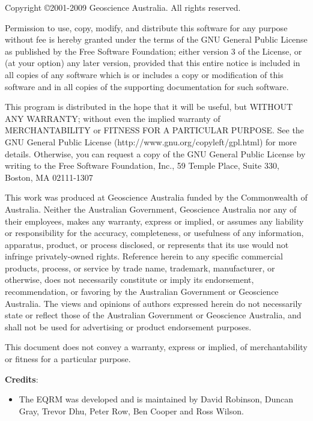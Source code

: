 \documentclass{article}
\begin{document}
\vspace*{0.5in}

Copyright \copyright 2001-2009 Geoscience Australia. All rights
reserved.

\vspace*{0.2in}

Permission to use, copy, modify, and distribute this software for any
purpose without fee is hereby granted under the terms of the GNU
General Public License as published by the Free Software Foundation;
either version 3 of the License, or (at your option) any later
version, provided that this entire notice is included in all copies
of any software which is or includes a copy or modification of this
software and in all copies of the supporting documentation for such
software.

This program is distributed in the hope that it will be useful, but
WITHOUT ANY WARRANTY; without even the implied warranty of
MERCHANTABILITY or FITNESS FOR A PARTICULAR PURPOSE.  See the GNU
General Public License (http://www.gnu.org/copyleft/gpl.html) for
more details. Otherwise, you can request a copy of the GNU General
Public License by writing to the Free Software Foundation, Inc., 59
Temple Place, Suite 330, Boston, MA 02111-1307

This work was produced at Geoscience Australia funded by the Commonwealth of Australia. Neither
the Australian Government, Geoscience Australia nor any of their employees, makes any warranty,
express or implied, or assumes any liability or responsibility for
the accuracy, completeness, or usefulness of any information,
apparatus, product, or process disclosed, or represents that its use
would not infringe privately-owned rights. Reference herein to any
specific commercial products, process, or service by trade name,
trademark, manufacturer, or otherwise, does not necessarily
constitute or imply its endorsement, recommendation, or favoring by
the Australian Government or Geoscience Australia.  The views and opinions of authors expressed
herein do not necessarily state or reflect those of the Australian
Government or Geoscience Australia, and shall not be used for advertising or product
endorsement purposes.

This document does not convey a warranty, express or implied,
of merchantability or fitness for a particular purpose.

  \vspace{0.2in}

\textbf{Credits}:
\begin{itemize}
\item The EQRM was developed and is maintained by David Robinson,
  Duncan Gray, Trevor Dhu, Peter Row, Ben Cooper and Ross Wilson.
\end{itemize}
\end{document}
